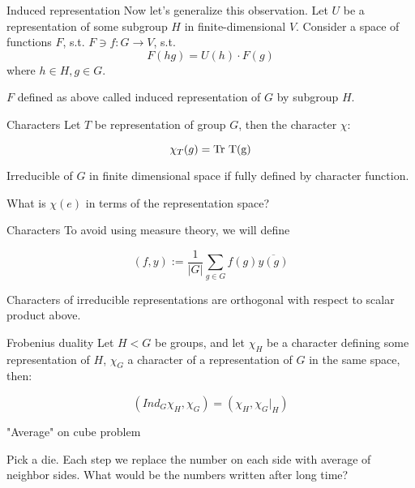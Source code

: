 \documentclass{beamer}
\def\Tr{\rm Tr}
\begin{document}
\begin{frame}{Induced representation}
    Now let's generalize this observation. Let $U$ be a representation of some subgroup $H$ in finite-dimensional $V$.
    Consider a space of functions $F$, s.t. $F\ni f: G \to V$, s.t.
    $$F(hg) = U(h) \cdot F(g)$$
    where $h\in H, g \in G$.

    \begin{definition}
        $F$ defined as above called induced representation of $G$ by subgroup $H$.
    \end{definition}
\end{frame}


\begin{frame}{Characters}
    Let $T$ be representation of group $G$, then the character $\chi$:
    \begin{definition}
        $$\chi_T (g) = \Tr \ T (g) $$
    \end{definition}
    \begin{theorem}
    Irreducible of $G$ in finite dimensional space if fully defined by character function.
    \end{theorem}
    What is $\chi (e)$ in terms of the representation space?
\end{frame}

\begin{frame}{Characters}
    To avoid using measure theory, we will define
    \begin{definition}
        $$(f,y) := \frac{1}{|G|} \sum_{g \in G} f(g) \overline{y(g)}$$
    \end{definition}
    \begin{theorem}
        Characters of irreducible representations are orthogonal with respect to scalar product above. 
    \end{theorem}
\end{frame}

\begin{frame}{Frobenius duality}
    Let $H < G$ be groups, and let $\chi_H$ be a character defining some representation of $H$, $\chi_G$ a character of a representation of $G$ in the same space, then:
    \begin{theorem}
        $$ \left( Ind_G \chi_H, \chi_G \right) = \left( \chi_H, \chi_G \left. \right|_H \right) $$
    \end{theorem}
\end{frame}


\begin{frame}{"Average" on cube problem}
\begin{example}
    Pick a die. Each step we replace the number on each side with average of neighbor sides.
What would be the numbers written after long time?
\end{example}
\end{frame}
\end{document}

